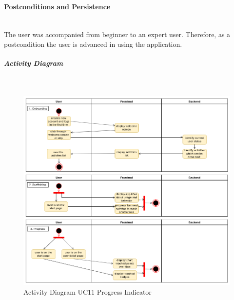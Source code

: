 \paragraph*{Postconditions and Persistence}\mbox{}\\
The user was accompanied from beginner to an expert user. Therefore, as a postcondition the user is advanced in using the application.

\newpage
\subparagraph{Activity Diagram}\mbox{}\\
\begin{figure}[H]
	\centering
	\includegraphics[width=1.0\textwidth]{Content/Domain/UC11ProgressIndicator.png}
	\caption{Activity Diagram  \ac{UC}11 Progress Indicator}
	\label{fig:label12}
\end{figure}
\newpage
